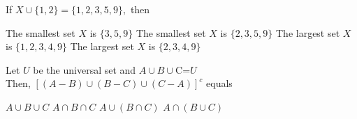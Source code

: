 \documentclass{exam}
\begin{document}


\begin{questions}

\question \label{m1q1-01}  If $ X\cup \{1,2\}=\{1,2,3,5,9\},$ then
    \begin{choices}
        \correctchoice The smallest set $X$ is $\{3,5,9\} $
        \choice The smallest set $X$ is $\{2,3,5,9\}$
        \choice The largest set $X$ is $\{1,2,3,4,9\}$
        \choice The largest set $X$ is $\{2,3,4,9\}$
    \end{choices}

\question \label{m1q1-02}  Let $U$ be the universal set and $A\cup B \cup $C=$U$\\
            Then, $[(A-B)\cup(B-C)\cup(C-A)]^c$ equals
    \begin{choices}
        \choice $ A \cup B\cup C $
        \choice $ A \cap B \cap C $
        \choice $ A\cup (B \cap C ) $
        \choice $ A \cap (B \cup C ) $
    \end{choices}
    
\end{questions}
\end{document}
